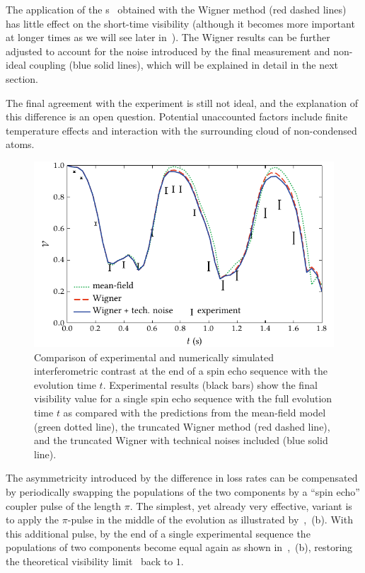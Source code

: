 The application of the s~ obtained with the Wigner method (red dashed lines) has little effect on the short-time visibility (although it becomes more important at longer times as we will see later in~).
The Wigner results can be further adjusted to account for the noise introduced by the final measurement and non-ideal coupling (blue solid lines), which will be explained in detail in the next section.

The final agreement with the experiment is still not ideal, and the explanation of this difference is an open question.
Potential unaccounted factors include finite temperature effects and interaction with the surrounding cloud of non-condensed atoms.

\begin{figure}
    \centerline{\includegraphics{figures_generated/bec_noise/echo_visibility_short.pdf}}

    \caption[Experimental and numerically simulated interferometric constrast in spin echo sequence]{
    Comparison of experimental and numerically simulated interferometric contrast at the end of a spin echo sequence with the evolution time $t$.
    Experimental results (black bars) show the final visibility value for a single spin echo sequence with the full evolution time $t$ as compared with the predictions from the mean-field model (green dotted line), the truncated Wigner method (red dashed line), and the truncated Wigner with technical noises included (blue solid line).}%

    \label{fig:bec-noise:visibility:echo-visibility}
\end{figure}

The asymmetricity introduced by the difference in loss rates can be compensated by periodically swapping the populations of the two components by a ``spin echo'' coupler pulse of the length $\pi$.
The simplest, yet already very effective, variant is to apply the $\pi$-pulse in the middle of the evolution as illustrated by~,~(b).
With this additional pulse, by the end of a single experimental sequence the populations of two components become equal again as shown in~,~(b), restoring the theoretical visibility limit~ back to $1$.


